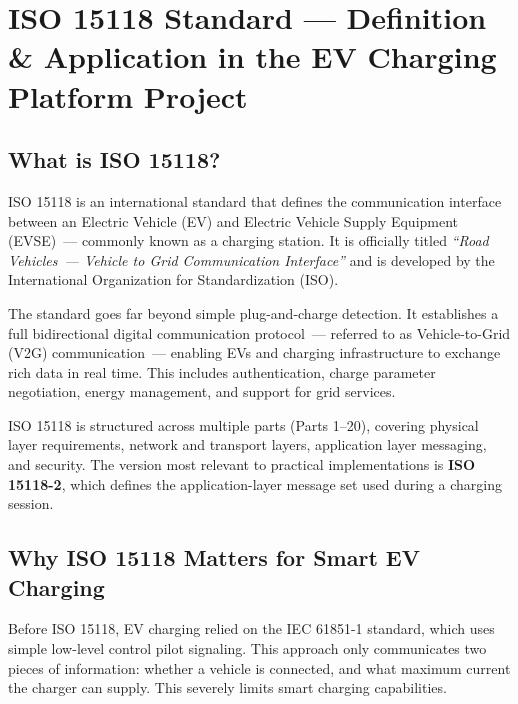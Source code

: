 \documentclass[12pt,a4paper]{report}
\begin{document}
\tableofcontents
\newpage


\chapter{ISO 15118 Standard --- Definition \& Application in the EV Charging Platform Project}

\section{What is ISO 15118?}

ISO 15118 is an international standard that defines the communication interface between an
Electric Vehicle (EV) and Electric Vehicle Supply Equipment (EVSE)~--- commonly known as a
charging station. It is officially titled \textit{``Road Vehicles~--- Vehicle to Grid Communication
Interface''} and is developed by the International Organization for Standardization (ISO).

The standard goes far beyond simple plug-and-charge detection. It establishes a full
bidirectional digital communication protocol~--- referred to as Vehicle-to-Grid (V2G)
communication~--- enabling EVs and charging infrastructure to exchange rich data in real time.
This includes authentication, charge parameter negotiation, energy management, and support for
grid services.

ISO 15118 is structured across multiple parts (Parts 1--20), covering physical layer
requirements, network and transport layers, application layer messaging, and security. The
version most relevant to practical implementations is \textbf{ISO 15118-2}, which defines the
application-layer message set used during a charging session.

\section{Why ISO 15118 Matters for Smart EV Charging}

Before ISO 15118, EV charging relied on the IEC 61851-1 standard, which uses simple low-level
control pilot signaling. This approach only communicates two pieces of information: whether a
vehicle is connected, and what maximum current the charger can supply. This severely limits
smart charging capabilities.
\end{document}
